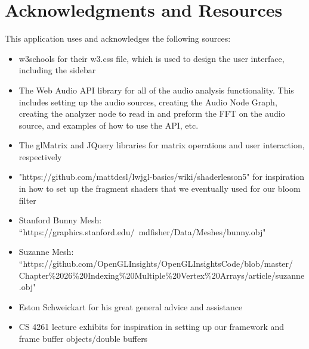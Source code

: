 \documentclass[12pt]{article}
\begin{document}
\section{Acknowledgments and Resources}
This application uses and acknowledges the following sources:
\begin{itemize}
	\item w3schools for their w3.css file, which is used to design the user interface, including the sidebar
	\item The Web Audio API library for all of the audio analysis functionality. This includes setting up the audio sources, creating the Audio Node Graph, creating the analyzer node to read in and preform the FFT on the audio source, and examples of how to use the API, etc.
	\item The glMatrix and JQuery libraries for matrix operations and user interaction, respectively
	\item "https://github.com/mattdesl/lwjgl-basics/wiki/shaderlesson5" for inspiration in how to set up the fragment shaders that we eventually used for our bloom filter
	\item Stanford Bunny Mesh: ``https://graphics.stanford.edu/~mdfisher/Data/Meshes/bunny.obj"
	\item Suzanne Mesh: ``https://github.com/OpenGLInsights/OpenGLInsightsCode/blob/master/\\
	Chapter\%2026\%20Indexing\%20Multiple\%20Vertex\%20Arrays/article/suzanne.obj"
	\item Eston Schweickart for his great general advice and assistance
	\item CS 4261 lecture exhibits for inspiration in setting up our framework and frame buffer objects/double buffers
\end{itemize}
\end{document}
